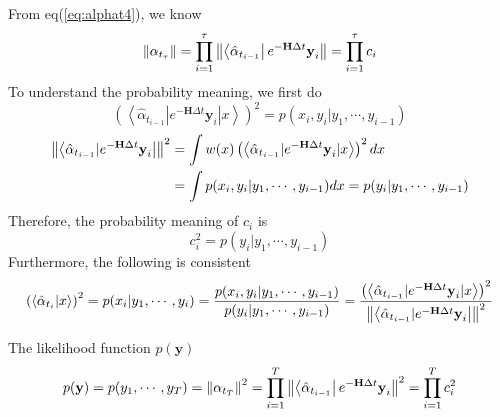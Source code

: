 \begin{definition}
From eq(\ref{eq:alphat4}), we know
\begin{equation}
        \left\lVert\alpha_{t_{\tau}}\right\rVert = \prod_{i=1}^{\tau} \left\lVert\left < \hat{\alpha}_{t_{i-1}} \right| e^{-\textbf{H}\Delta t} \textbf{y}_i\right\rVert = \prod_{i=1}^{\tau} c_i
\end{equation}
To understand the probability meaning, we first do 
\begin{equation}
        \left(\left < \hat{\alpha}_{t_{i-1}} | e^{-\textbf{H}\Delta t} \textbf{y}_{i} | x \right>\right)^2 = p(x_{i},y_{i}|y_1,\cdots,y_{i-1})   
\end{equation}
\begin{equation}
\begin{split}       
        \left\lVert\left < \hat{\alpha}_{t_{i-1}} | e^{-\textbf{H}\Delta t} \textbf{y}_{i} \right|\right\rVert^2 &= \int w(x) \left(\left < \hat{\alpha}_{t_{i-1}} | e^{-\textbf{H}\Delta t} \textbf{y}_{i} | x \right>\right)^2 dx \\
        &= \int p(x_{i},y_{i}|y_1,\cdots,y_{i-1}) dx = p(y_i | y_1,\cdots,y_{i-1})
\end{split}
\end{equation}
Therefore, the probability meaning of $c_i$ is 
\begin{equation}
        c_i^2 = p(y_i | y_1,\cdots,y_{i-1})
\label{eq:scalefactor} 
\end{equation}
Furthermore, the following is consistent
\begin{equation}
        \left(\left < \hat{\alpha}_{t_i} | x \right>\right)^2 =  p(x_{i}|y_1,\cdots,y_{i})  = 
        \frac{p(x_{i},y_{i}|y_1,\cdots,y_{i-1})}{p(y_i | y_1,\cdots,y_{i-1})} = \frac{  \left(\left < \hat{\alpha}_{t_{i-1}} | e^{-\textbf{H}\Delta t} \textbf{y}_{i} | x \right>\right)^2 }{ \left\lVert\left < \hat{\alpha}_{t_{i-1}} | e^{-\textbf{H}\Delta t} \textbf{y}_{i} \right|\right\rVert^2 } 
\end{equation}
\end{definition}

\begin{definition}
The likelihood function $p(\textbf{y})$
\begin{equation}
        p(\textbf{y}) = p(y_1,\cdots,y_T) = \left\lVert\alpha_{t_{T}}\right\rVert^2 = \prod_{i=1}^{T} \left\lVert\left < \hat{\alpha}_{t_{i-1}} \right| e^{-\textbf{H}\Delta t} \textbf{y}_i\right\rVert^2 = \prod_{i=1}^{T} c_i^2
\end{equation}              
\end{definition}

